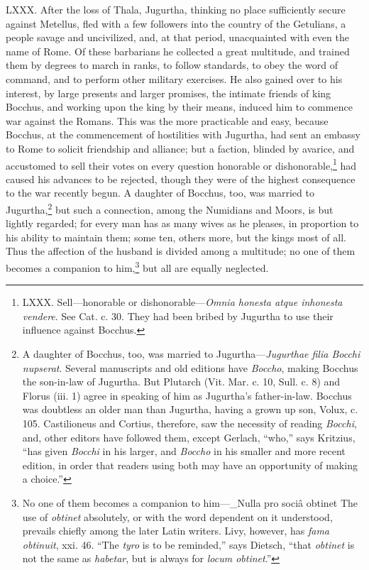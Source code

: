 LXXX. After the loss of Thala, Jugurtha, thinking no place sufficiently
secure against Metellus, fled with a few followers into the country of
the Getulians, a people savage and uncivilized, and, at that period,
unacquainted with even the name of Rome. Of these barbarians he collected
a great multitude, and trained them by degrees to march in ranks, to
follow standards, to obey the word of command, and to perform other
military exercises. He also gained over to his interest, by large
presents and larger promises, the intimate friends of king Bocchus, and
working upon the king by their means, induced him to commence war
against the Romans. This was the more practicable and easy, because
Bocchus, at the commencement of hostilities with Jugurtha, had sent an
embassy to Rome to solicit friendship and alliance; but a faction,
blinded by avarice, and accustomed to sell their votes on every question
honorable or dishonorable,\footnote{LXXX. Sell—honorable or dishonorable—\emph{Omnia honesta atque
inhonesta vendere}. See Cat. c. 30. They had been bribed by Jugurtha
to use their influence against Bocchus.} had caused his advances to be rejected,
though they were of the highest consequence to the war recently begun.
A daughter of Bocchus, too, was married to Jugurtha,\footnote{A daughter of Bocchus, too, was married to Jugurtha—\emph{Jugurthae
filia Bocchi nupserat}. Several manuscripts and old editions have
\emph{Boccho}, making Bocchus the son-in-law of Jugurtha. But Plutarch
(Vit. Mar. c. 10, Sull. c. 8) and Florus (iii. 1) agree in speaking
of him as Jugurtha's father-in-law. Bocchus was doubtless an older man
than Jugurtha, having a grown up son, Volux, c. 105. Castilioneus and
Cortius, therefore, saw the necessity of reading \emph{Bocchi}, and, other
editors have followed them, except Gerlach, ``who,'' says Kritzius, ``has
given \emph{Bocchi} in his larger, and \emph{Boccho} in his smaller and more
recent edition, in order that readers using both may have an
opportunity of making a choice.''} but such a
connection, among the Numidians and Moors, is but lightly regarded;
for every man has as many wives as he pleases, in proportion to his
ability to maintain them; some ten, others more, but the kings most of
all. Thus the affection of the husband is divided among a multitude;
no one of them becomes a companion to him,\footnote{No one of them becomes a companion to him—\_Nulla pro sociâ
obtinet The use of \emph{obtinet} absolutely, or with the word dependent on
it understood, prevails chiefly among the later Latin writers. Livy,
however, has \emph{fama obtinuit}, xxi. 46. ``The \emph{tyro} is to be reminded,''
says Dietsch, ``that \emph{obtinet} is not the same as \emph{habetar}, but is
always for \emph{locum obtinet}.''} but all are equally
neglected.

